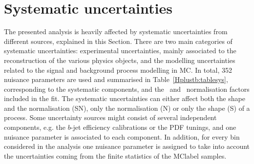 \section{Systematic uncertainties}
The presented analysis is heavily affected by systematic uncertainties from different sources, explained in this Section. There are two main categories of systematic uncertainties: experimental uncertainties, mainly associated to the reconstruction of the various physics objects, and the modelling uncertainties related to the signal and background process modelling in MC. In total, 352 nuisance parameters are used and summarised in Table~\ref{Hplustb:tablesys}, corresponding to the systematic components, and the \ttb\ and \ttc\ normalisation factors included in the fit. The systematic uncertainties can either affect both the shape and the normalisation (SN), only the normalisation (N) or only the shape (S) of a process. Some uncertainty sources might consist of several independent components, e.g. the $b$-jet efficiency calibrations or the PDF tunings, and one nuisance parameter is associated to each component. In addition, for every bin considered in the analysis one nuisance parameter is assigned to take into account the uncertainties coming from the finite statistics of the \acrshort{MClabel} samples.

